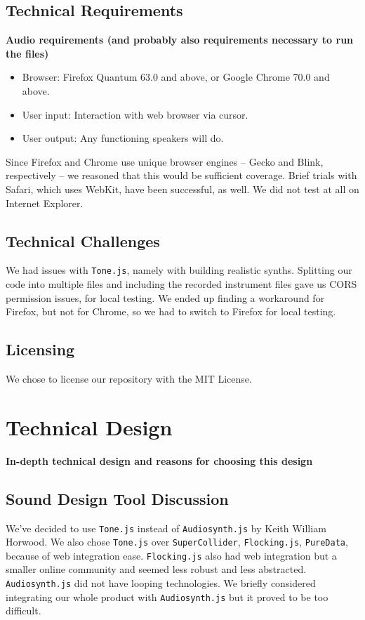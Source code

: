 \documentclass[12pt,a4paper]{article}
\newcommand{\lightcode}[1]{\colorbox{light-gray}{\texttt{#1}}}
\begin{document}
\subsection{Technical Requirements}
\textbf{Audio requirements (and probably also requirements necessary to run the files)}

\begin{itemize}
	\item Browser: Firefox Quantum 63.0 and above, or Google Chrome 70.0 and above.
	\item User input: Interaction with web browser via cursor.
	\item User output: Any functioning speakers will do.
\end{itemize}

Since Firefox and Chrome use unique browser engines -- Gecko and Blink, respectively -- we reasoned that this would be sufficient coverage. Brief trials with Safari, which uses WebKit, have been successful, as well. We did not test at all on Internet Explorer.

\subsection{Technical Challenges}
We had issues with \lightcode{Tone.js}, namely with building realistic synths. Splitting our code into multiple files and including the recorded instrument files gave us CORS permission issues, for local testing. We ended up finding a workaround for Firefox, but not for Chrome, so we had to switch to Firefox for local testing.

\subsection{Licensing}
We chose to license our repository with the MIT License.


\pagebreak
\section{Technical Design}
\textbf{In-depth technical design and reasons for choosing this design}

\subsection{Sound Design Tool Discussion}
We've decided to use \lightcode{Tone.js} instead of \lightcode{Audiosynth.js} by Keith William Horwood. We also chose \lightcode{Tone.js} over \lightcode{SuperCollider}, \lightcode{Flocking.js}, \lightcode{PureData}, because of web integration ease. \lightcode{Flocking.js} also had web integration but a smaller online community and seemed less robust and less abstracted. \lightcode{Audiosynth.js} did not have looping technologies. We briefly considered integrating our whole product with \lightcode{Audiosynth.js} but it proved to be too difficult.
\end{document}
